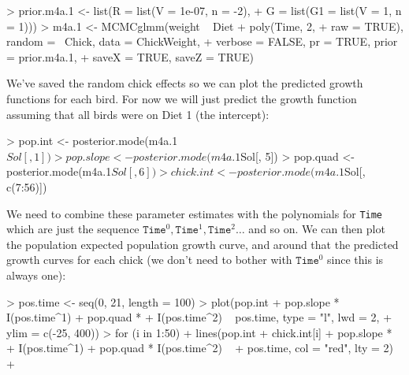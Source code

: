 \documentclass{article}
\begin{document}
\begin{Schunk}
\begin{Sinput}
> prior.m4a.1 <- list(R = list(V = 1e-07, n = -2), 
+     G = list(G1 = list(V = 1, n = 1)))
> m4a.1 <- MCMCglmm(weight ~ Diet + poly(Time, 2, 
+     raw = TRUE), random = ~Chick, data = ChickWeight, 
+     verbose = FALSE, pr = TRUE, prior = prior.m4a.1, 
+     saveX = TRUE, saveZ = TRUE)
\end{Sinput}
\end{Schunk}

We've saved the random chick effects so we can plot the predicted growth functions for each bird. For now we will just predict the growth function assuming that all birds were on Diet 1 (the intercept): 

\begin{Schunk}
\begin{Sinput}
> pop.int <- posterior.mode(m4a.1$Sol[, 1])
> pop.slope <- posterior.mode(m4a.1$Sol[, 5])
> pop.quad <- posterior.mode(m4a.1$Sol[, 6])
> chick.int <- posterior.mode(m4a.1$Sol[, c(7:56)])
\end{Sinput}
\end{Schunk}

We need to combine these parameter estimates with the polynomials for \texttt{Time} which are just the sequence $\texttt{Time}^{0}, \texttt{Time}^1, \texttt{Time}^2 \dots$ and so on. We can then plot the population expected population growth curve, and around that the predicted growth curves for each chick (we don't need to bother with $\texttt{Time}^{0}$ since this is always one):

\iftalk
\else

\begin{Schunk}
\begin{Sinput}
> pos.time <- seq(0, 21, length = 100)
> plot(pop.int + pop.slope * I(pos.time^1) + pop.quad * 
+     I(pos.time^2) ~ pos.time, type = "l", lwd = 2, 
+     ylim = c(-25, 400))
> for (i in 1:50) {
+     lines(pop.int + chick.int[i] + pop.slope * 
+         I(pos.time^1) + pop.quad * I(pos.time^2) ~ 
+         pos.time, col = "red", lty = 2)
+ }
\end{Sinput}
\end{Schunk}
\fi
\end{document}

